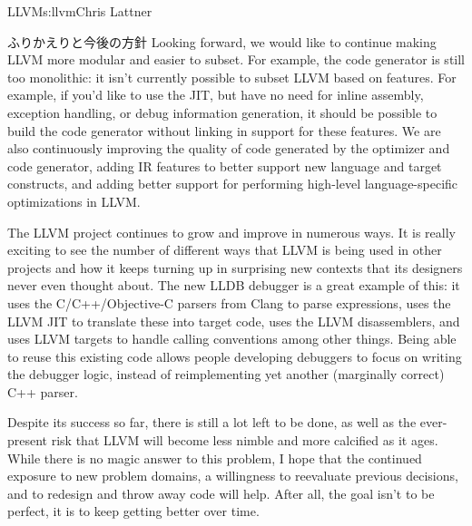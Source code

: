 \begin{aosachapter}{LLVM}{s:llvm}{Chris Lattner}
\begin{aosasect1}{ふりかえりと今後の方針}
Looking forward, we would like to continue making LLVM more modular
and easier to subset.  For example, the code generator is still too
monolithic: it isn't currently possible to subset LLVM based on
features.  For example, if you'd like to use the JIT, but have no need
for inline assembly, exception handling, or debug information
generation, it should be possible to build the code generator without
linking in support for these features.  We are also continuously
improving the quality of code generated by the optimizer and code
generator, adding IR features to better support new language and
target constructs, and adding better support for performing high-level
language-specific optimizations in LLVM.

The LLVM project continues to grow and improve in numerous ways.  It
is really exciting to see the number of different ways that LLVM is
being used in other projects and how it keeps turning up in surprising
new contexts that its designers never even thought about.  The new
LLDB debugger is a great example of this: it uses the
C/C++/Objective-C parsers from Clang to parse expressions, uses the
LLVM JIT to translate these into target code, uses the LLVM
disassemblers, and uses LLVM targets to handle calling conventions
among other things.  Being able to reuse this existing code allows
people developing debuggers to focus on writing the debugger logic, instead of
reimplementing yet another (marginally correct) C++ parser.

Despite its success so far, there is still a lot left to be done, as
well as the ever-present risk that LLVM will become less nimble and
more calcified as it ages.  While there is no magic answer to this
problem, I hope that the continued exposure to new problem domains, a
willingness to reevaluate previous decisions, and to
redesign and throw away code will help.  After all, the goal isn't to
be perfect, it is to keep getting better over time.

\end{aosasect1}

\end{aosachapter}
